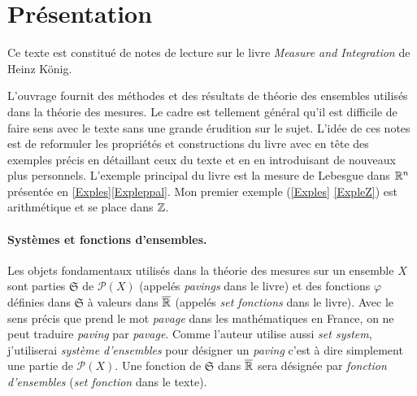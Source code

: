 


\section{Présentation}
\noindent Ce texte est constitué de notes de lecture sur le livre \emph{Measure and Integration} de Heinz König.

\noindent L'ouvrage fournit des méthodes et des résultats de théorie des ensembles utilisés dans la théorie des mesures. Le cadre est tellement général qu'il est difficile de faire sens avec le texte sans une grande érudition sur le sujet. L'idée de ces notes est de reformuler les propriétés et constructions du livre avec en tête des exemples précis en détaillant ceux du texte et en en introduisant de nouveaux plus personnels.\newline
L'exemple principal du livre est la mesure de Lebesgue dans $\mathbb{R}^n$ présentée en \ref{Exples}\ref{Expleppal}. Mon premier exemple (\ref{Exples} \ref{ExpleZ}) est arithmétique et se place dans $\mathbb{Z}$.

\paragraph*{Systèmes et fonctions d'ensembles.}
Les objets fondamentaux utilisés dans la théorie des mesures sur un ensemble $X$ sont parties $\mathfrak{S}$ de $\mathcal{P}(X)$ (appelés \emph{pavings} dans le livre) et des fonctions $\varphi$ définies dans $\mathfrak{S}$ à valeurs dans $\overline{\mathbb{R}}$ (appelés \emph{set fonctions} dans le livre).\newline
Avec le sens précis que prend le mot \emph{pavage} dans les mathématiques en France, on ne peut traduire \emph{paving} par \emph{pavage}. Comme l'auteur utilise aussi \emph{set system}, j'utiliserai \emph{système d'ensembles} pour désigner un \emph{paving} c'est à dire simplement une partie de $\mathcal{P}(X)$.\newline
Une fonction de $\mathfrak{S}$ dans $\overline{\mathbb{R}}$ sera désignée par \emph{fonction d'ensembles} (\emph{set fonction} dans le texte).

